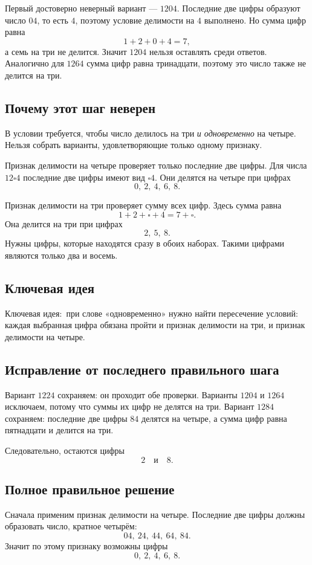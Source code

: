 \documentclass[12pt,a4paper]{article}
\newcommand{\KeyIdea}{\textcolor{blue!60!black}{Ключевая идея:}}
\begin{document}
Первый достоверно неверный вариант --- $1204$. Последние две цифры образуют число $04$, то есть $4$, поэтому условие делимости на $4$ выполнено. Но сумма цифр равна
\[
1+2+0+4=7,
\]
а семь на три не делится. Значит $1204$ нельзя оставлять среди ответов. Аналогично для $1264$ сумма цифр равна тринадцати, поэтому это число также не делится на три.

\subsection*{Почему этот шаг неверен}
В условии требуется, чтобы число делилось на три \emph{и одновременно} на четыре. Нельзя собрать варианты, удовлетворяющие только одному признаку.

Признак делимости на четыре проверяет только последние две цифры. Для числа $12\square4$ последние две цифры имеют вид $\square4$. Они делятся на четыре при цифрах
\[
0,\ 2,\ 4,\ 6,\ 8.
\]

Признак делимости на три проверяет сумму всех цифр. Здесь сумма равна
\[
1+2+\square+4=7+\square.
\]
Она делится на три при цифрах
\[
2,\ 5,\ 8.
\]
Нужны цифры, которые находятся сразу в обоих наборах. Такими цифрами являются только два и восемь.

\subsection*{Ключевая идея}
\KeyIdea\ при слове «одновременно» нужно найти пересечение условий: каждая выбранная цифра обязана пройти и признак делимости на три, и признак делимости на четыре.

\subsection*{Исправление от последнего правильного шага}
Вариант $1224$ сохраняем: он проходит обе проверки. Варианты $1204$ и $1264$ исключаем, потому что суммы их цифр не делятся на три. Вариант $1284$ сохраняем: последние две цифры $84$ делятся на четыре, а сумма цифр равна пятнадцати и делится на три.

Следовательно, остаются цифры
\[
2\quad\text{и}\quad8.
\]

\subsection*{Полное правильное решение}
Сначала применим признак делимости на четыре. Последние две цифры должны образовать число, кратное четырём:
\[
04,\ 24,\ 44,\ 64,\ 84.
\]
Значит по этому признаку возможны цифры
\[
0,\ 2,\ 4,\ 6,\ 8.
\]
\end{document}
